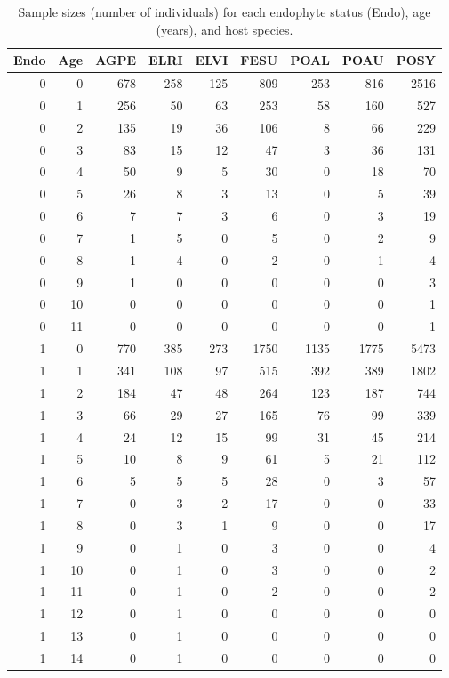 \documentclass[11pt]{article}
\begin{document}
\begin{table}[ht]
	\centering
	\begin{tabular}{rrrrrrrrr}
		\hline
		Endo & Age & AGPE & ELRI & ELVI & FESU & POAL & POAU & POSY \\ 
		\hline
		0 & 0 & 678 & 258 & 125 & 809 & 253 & 816 & 2516 \\ 
		0 & 1 & 256 & 50 & 63 & 253 & 58 & 160 & 527 \\ 
		0 & 2 & 135 & 19 & 36 & 106 & 8 & 66 & 229 \\ 
		0 & 3 & 83 & 15 & 12 & 47 & 3 & 36 & 131 \\ 
		0 & 4 & 50 & 9 & 5 & 30 & 0 & 18 & 70 \\ 
		0 & 5 & 26 & 8 & 3 & 13 & 0 & 5 & 39 \\ 
		0 & 6 & 7 & 7 & 3 & 6 & 0 & 3 & 19 \\ 
		0 & 7 & 1 & 5 & 0 & 5 & 0 & 2 & 9 \\ 
		0 & 8 & 1 & 4 & 0 & 2 & 0 & 1 & 4 \\ 
		0 & 9 & 1 & 0 & 0 & 0 & 0 & 0 & 3 \\ 
		0 & 10 & 0 & 0 & 0 & 0 & 0 & 0 & 1 \\ 
		0 & 11 & 0 & 0 & 0 & 0 & 0 & 0 & 1 \\ 
		1 & 0 & 770 & 385 & 273 & 1750 & 1135 & 1775 & 5473 \\ 
		1 & 1 & 341 & 108 & 97 & 515 & 392 & 389 & 1802 \\ 
		1 & 2 & 184 & 47 & 48 & 264 & 123 & 187 & 744 \\ 
		1 & 3 & 66 & 29 & 27 & 165 & 76 & 99 & 339 \\ 
		1 & 4 & 24 & 12 & 15 & 99 & 31 & 45 & 214 \\ 
		1 & 5 & 10 & 8 & 9 & 61 & 5 & 21 & 112 \\ 
		1 & 6 & 5 & 5 & 5 & 28 & 0 & 3 & 57 \\ 
		1 & 7 & 0 & 3 & 2 & 17 & 0 & 0 & 33 \\ 
		1 & 8 & 0 & 3 & 1 & 9 & 0 & 0 & 17 \\ 
		1 & 9 & 0 & 1 & 0 & 3 & 0 & 0 & 4 \\ 
		1 & 10 & 0 & 1 & 0 & 3 & 0 & 0 & 2 \\ 
		1 & 11 & 0 & 1 & 0 & 2 & 0 & 0 & 2 \\ 
		1 & 12 & 0 & 1 & 0 & 0 & 0 & 0 & 0 \\ 
		1 & 13 & 0 & 1 & 0 & 0 & 0 & 0 & 0 \\ 
		1 & 14 & 0 & 1 & 0 & 0 & 0 & 0 & 0 \\ 
		\hline
	\end{tabular}
\caption{Sample sizes (number of individuals) for each endophyte status (Endo), age (years), and host species.}
\label{tab:age_n}
\end{table}



\end{document}
